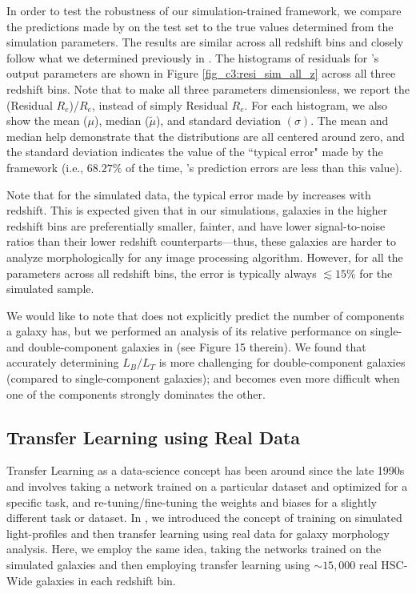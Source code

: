 In order to test the robustness of our simulation-trained framework, we compare the predictions made by \gampen{} on the test set to the true values determined from the simulation parameters. The results are similar across all redshift bins and closely follow what we determined previously in \citet{gampen_software_paper}. The histograms of residuals for \gampen{}'s output parameters are shown in Figure \ref{fig_c3:resi_sim_all_z} across all three redshift bins. Note that to make all three parameters dimensionless, we report the (Residual $R_e$)/$R_e$, instead of simply Residual $R_e$. For each histogram, we also show the mean ($\mu$), median ($\tilde{\mu}$), and standard deviation $(\sigma)$. The mean and median help demonstrate that the distributions are all centered around zero, and the standard deviation indicates the value of the ``typical error" made by the framework (i.e., $68.27\%$ of the time, \gampen{}'s prediction errors are less than this value).

Note that for the simulated data, the typical error made by \gampen{} increases with redshift. This is expected given that in our simulations, galaxies in the higher redshift bins are preferentially smaller, fainter, and have lower signal-to-noise ratios than their lower redshift counterparts---thus, these galaxies are harder to analyze morphologically for any image processing algorithm. However, for all the parameters across all redshift bins, the \gampen{} error is typically always $\lesssim 15\%$ for the simulated sample.

We would like to note that \gampen{} does not explicitly predict the number of components a galaxy has, but we performed an analysis of its relative performance on single- and double-component galaxies in \citet{gampen_software_paper} (see Figure 15 therein). We found that accurately determining $L_B/L_T$ is more challenging for double-component galaxies (compared to single-component galaxies); and becomes even more difficult when one of the components strongly dominates the other.

\subsection{Transfer Learning using Real Data} 
\label{sec_c3:transfer_learning}

Transfer Learning as a data-science concept has been around since the late 1990s \citep[e.g.,][]{blum_1998} and involves taking a network trained on a particular dataset and optimized for a specific task, and re-tuning/fine-tuning the weights and biases for a slightly different task or dataset.  In \citet{gamornet_paper}, we introduced the concept of training on simulated light-profiles and then transfer learning using real data for galaxy morphology analysis. Here, we employ the same idea, taking the networks trained on the simulated galaxies and then employing transfer learning using $\sim15,000$ real HSC-Wide galaxies in each redshift bin.

